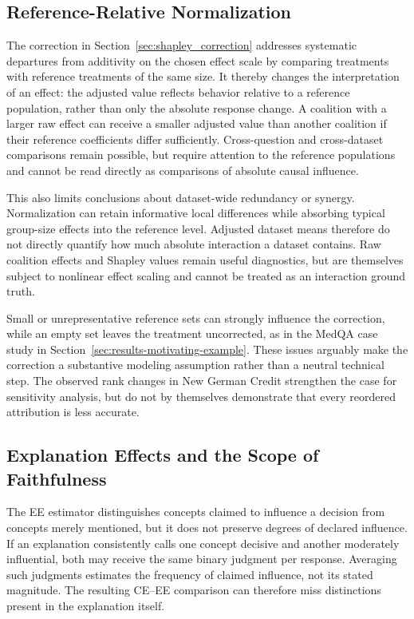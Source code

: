 \subsection{Reference-Relative Normalization}
\label{sec:normalization_limitations}

The correction in Section~\ref{sec:shapley_correction} addresses systematic departures from additivity on the chosen effect scale by comparing treatments with reference treatments of the same size. It thereby changes the interpretation of an effect: the adjusted value reflects behavior relative to a reference population, rather than only the absolute response change. A coalition with a larger raw effect can receive a smaller adjusted value than another coalition if their reference coefficients differ sufficiently. Cross-question and cross-dataset comparisons remain possible, but require attention to the reference populations and cannot be read directly as comparisons of absolute causal influence.

This also limits conclusions about dataset-wide redundancy or synergy. Normalization can retain informative local differences while absorbing typical group-size effects into the reference level. Adjusted dataset means therefore do not directly quantify how much absolute interaction a dataset contains. Raw coalition effects and Shapley values remain useful diagnostics, but are themselves subject to nonlinear effect scaling and cannot be treated as an interaction ground truth.

Small or unrepresentative reference sets can strongly influence the correction, while an empty set leaves the treatment uncorrected, as in the MedQA case study in Section~\ref{sec:results-motivating-example}. These issues arguably make the correction a substantive modeling assumption rather than a neutral technical step. The observed rank changes in New German Credit strengthen the case for sensitivity analysis, but do not by themselves demonstrate that every reordered attribution is less accurate.

\subsection{Explanation Effects and the Scope of Faithfulness}

The EE estimator distinguishes concepts claimed to influence a decision from concepts merely mentioned, but it does not preserve degrees of declared influence. If an explanation consistently calls one concept decisive and another moderately influential, both may receive the same binary judgment per response. Averaging such judgments estimates the frequency of claimed influence, not its stated magnitude. The resulting CE--EE comparison can therefore miss distinctions present in the explanation itself.

